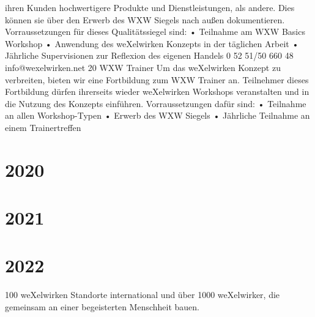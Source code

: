 ihren Kunden hochwertigere Produkte und Dienstleistungen, als andere. Dies können sie über den 
Erwerb des WXW Siegels nach außen dokumentieren. Vorraussetzungen für dieses Qualitätssiegel sind:
•
Teilnahme am WXW Basics Workshop
•
Anwendung des weXelwirken Konzepts in der täglichen Arbeit
•
Jährliche Supervisionen zur Reflexion des eigenen Handels   
0 52 51/50 660 48
info@wexelwirken.net
20
WXW Trainer
Um das weXelwirken Konzept zu verbreiten, bieten wir eine Fortbildung zum WXW Trainer an. 
Teilnehmer dieses Fortbildung dürfen ihrerseits wieder weXelwirken Workshops veranstalten und in die 
Nutzung des Konzepts einführen. Vorraussetzungen dafür sind:
•
Teilnahme an allen Workshop-Typen
•
Erwerb des WXW Siegels
•
Jährliche Teilnahme an einem Trainertreffen
  \section{2020}
  \section{2021}
  \section{2022}
100 weXelwirken Standorte international und über 1000 weXelwirker, die gemeinsam an einer begeisterten Menschheit bauen.
